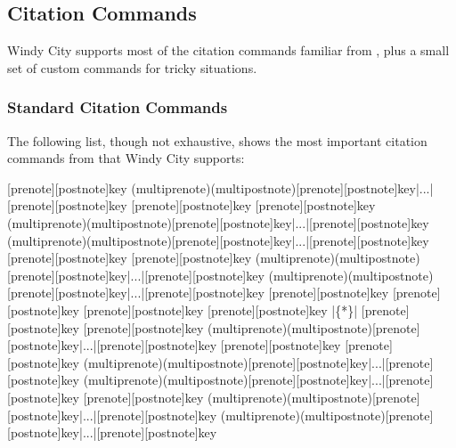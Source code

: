 \documentclass[11pt,letterpaper,oneside]{article}
\begin{document}
\subsection{Citation Commands}

Windy City supports most of the citation commands familiar from
\biblatex, plus a small set of custom commands for tricky situations.

\subsubsection{Standard Citation Commands}
\label{std.cmd}

The following list, though not exhaustive, shows the most important
citation commands from \biblatex that Windy City supports:

\begin{ltxsyntax}
[prenote][postnote]{key}
(multiprenote)(multipostnote)[prenote][postnote]{key}|...|[prenote][postnote]{key}
[prenote][postnote]{key}
[prenote][postnote]{key}
(multiprenote)(multipostnote)[prenote][postnote]{key}|...|[prenote][postnote]{key}
(multiprenote)(multipostnote)[prenote][postnote]{key}|...|[prenote][postnote]{key}
[prenote][postnote]{key}
[prenote][postnote]{key}
(multiprenote)(multipostnote)[prenote][postnote]{key}|...|[prenote][postnote]{key}
(multiprenote)(multipostnote)[prenote][postnote]{key}|...|[prenote][postnote]{key}
[prenote][postnote]{key}
[prenote][postnote]{key}
[prenote][postnote]{key}
[prenote][postnote]{key}
|\{*\}|
[prenote][postnote]{key}
[prenote][postnote]{key}
(multiprenote)(multipostnote)[prenote][postnote]{key}|...|[prenote][postnote]{key}
[prenote][postnote]{key}
[prenote][postnote]{key}
(multiprenote)(multipostnote)[prenote][postnote]{key}|...|[prenote][postnote]{key}
(multiprenote)(multipostnote)[prenote][postnote]{key}|...|[prenote][postnote]{key}
[prenote][postnote]{key}
(multiprenote)(multipostnote)[prenote][postnote]{key}|...|[prenote][postnote]{key}
(multiprenote)(multipostnote)[prenote][postnote]{key}|...|[prenote][postnote]{key}
\end{ltxsyntax}
\end{document}
